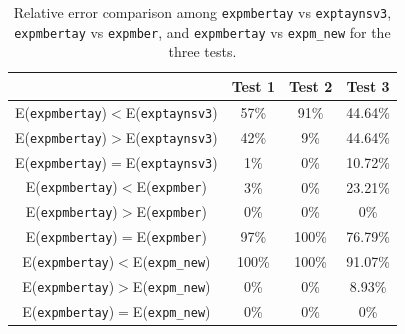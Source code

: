 \documentclass[preprint,10pt,numbers,sort&compress]{elsarticle}
\begin{document}
\begin{table}[!t]\begin{center}
                \caption{Relative error comparison among \texttt{expmbertay} vs \texttt{exptaynsv3}, \texttt{expmbertay} vs \texttt{expmber}, and \texttt{expmbertay} vs \texttt{expm\_new} for the three tests.}
{\footnotesize
               \begin{tabular}{|c||c|c|c|}\hline & Test 1  &Test 2 & Test 3\\\hline
                        E(\texttt{expmbertay})$<$E(\texttt{exptaynsv3})    &   57\%  &   91\%  & 44.64\%\\\hline
                        E(\texttt{expmbertay})$>$E(\texttt{exptaynsv3})    &   42\%  &     9\%  & 44.64\%\\\hline
                        E(\texttt{expmbertay})$=$E(\texttt{exptaynsv3})    &     1\%  &     0\% &  10.72\%\\\hline
                        E(\texttt{expmbertay})$<$E(\texttt{expmber})       &     3\%  &     0\%  & 23.21\%\\\hline
                        E(\texttt{expmbertay})$>$E(\texttt{expmber})       &     0\%  &     0\%  &    0\%\\\hline
                        E(\texttt{expmbertay})$=$E(\texttt{expmber})       &   97\%  &  100\%  & 76.79\%\\\hline
                        E(\texttt{expmbertay})$<$E(\texttt{expm\_new})   & 100\%  & 100\%  &  91.07\%\\\hline
                        E(\texttt{expmbertay})$>$E(\texttt{expm\_new})   &    0\%  &     0\%  &  8.93\%\\\hline
                        E(\texttt{expmbertay})$=$E(\texttt{expm\_new})   &    0\%  &     0\%  &       0\%\\\hline
                \end{tabular}}
                \label{table_err_comparative_expmbertay}
        \end{center}
\end{table}
\end{document}
